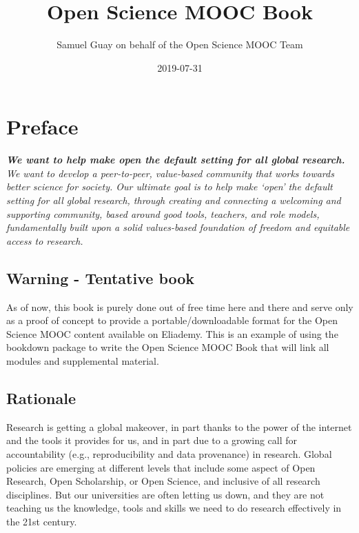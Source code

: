 \documentclass[]{book}
\title{Open Science MOOC Book}
\author{Samuel Guay on behalf of the Open Science MOOC Team}
\date{2019-07-31}
\begin{document}
\maketitle

{
\setcounter{tocdepth}{1}
\tableofcontents
}
\hypertarget{preface}{%
\chapter*{Preface}\label{preface}}

\textbf{\emph{We want to help make open the default setting for all global research.}} \emph{We want to develop a peer-to-peer, value-based community that works towards better science for society. Our ultimate goal is to help make `open' the default setting for all global research, through creating and connecting a welcoming and supporting community, based around good tools, teachers, and role models, fundamentally built upon a solid values-based foundation of freedom and equitable access to research.}

\hypertarget{warning---tentative-book}{%
\section*{Warning - Tentative book}\label{warning---tentative-book}}

As of now, this book is purely done out of free time here and there and serve only as a proof of concept to provide a portable/downloadable format for the Open Science MOOC content available on Eliademy. This is an example of using the bookdown package to write the Open Science MOOC Book that will link all modules and supplemental material.

\hypertarget{rationale}{%
\section*{Rationale}\label{rationale}}

Research is getting a global makeover, in part thanks to the power of the internet and the tools it provides for us, and in part due to a growing call for accountability (e.g., reproducibility and data provenance) in research. Global policies are emerging at different levels that include some aspect of Open Research, Open Scholarship, or Open Science, and inclusive of all research disciplines. But our universities are often letting us down, and they are not teaching us the knowledge, tools and skills we need to do research effectively in the 21st century.
\end{document}
